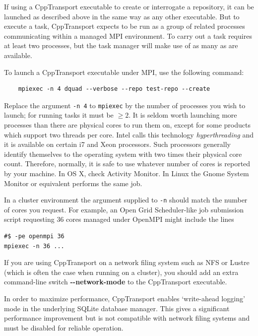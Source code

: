 \documentclass[11pt,a4paper]{article}
\newenvironment{warning}{\begin{tcolorbox}[enhanced,breakable,colback=red!10,colbacktitle=red!20,colframe=red!40,coltitle=black,title={Warning},fonttitle=\sffamily\fontseries{b}\selectfont]}{\end{tcolorbox}}
\newcommand{\packagefont}{\sffamily}
\newcommand{\CppTransport}{{\packagefont CppTransport}}
\newcommand{\MPI}{{\packagefont MPI}}
\newcommand{\OpenMPI}{{\packagefont OpenMPI}}
\newcommand{\SQLite}{{\packagefont SQLite}}
\newcommand{\option}[1]{{\ttfamily\bfseries\small #1}}
\newcommand{\semibold}[1]{{\fontseries{b}\selectfont{#1}}}
\newcommand{\para}[1]{\par\vspace{2mm}\noindent\semibold{{#1.}---}\ignorespaces}
\renewcommand{\geq}{\geqslant}
\begin{document}
\para{Launching {\CppTransport} using MPI}
If using a {\CppTransport} executable to create or
interrogate a repository, it can be launched as described above
in the same way as any other executable.
But to execute a task, {\CppTransport} expects to be run as a group
of related processes communicating within a managed {\MPI}
environment.
To carry out a task requires at least two processes,
but the task manager will make use of as many as are available.

To launch a {\CppTransport} executable under {\MPI},
use the following command:
\begin{verbatim}
    mpiexec -n 4 dquad --verbose --repo test-repo --create
\end{verbatim}
Replace the argument
\texttt{-n 4} to \texttt{mpiexec}
by the number of processes you wish to launch;
for running tasks it must be $\geq 2$.
It is seldom worth launching more processes than
there are physical cores to run them on,
except for some 
products which support two
threads per core.
Intel calls this technology \emph{hyperthreading}
and it is available on certain i7 and Xeon
processors.
Such processors generally
identify themselves to the operating system with
two times their
physical core count.
Therefore, normally,
it is safe to use whatever number of
cores is reported by your machine.
In OS X, check Activity Monitor.
In Linux the Gnome System Monitor or equivalent performs
the same job.

In a cluster environment the argument
supplied to
\texttt{-n} should match the number of
cores you request.
For example, an Open Grid Scheduler-like job submission
script requesting 36 cores
managed under {\OpenMPI}
might include the lines
\begin{verbatim}
#$ -pe openmpi 36
mpiexec -n 36 ...
\end{verbatim}
\begin{warning}
    If you are using {\CppTransport} on a network filing system
    such as NFS or Lustre (which is often the case when running on a cluster),
    you should add an extra command-line
    switch \option{{-}{-}network-mode}
    to the {\CppTransport} executable.
    
    In order to maximize performance, {\CppTransport}
    enables `write-ahead logging' mode in the underlying
    {\SQLite} database manager.
    This gives a significant performance improvement but is
    not compatible with network filing systems
    and must be disabled for reliable operation.
\end{warning}
\end{document}
